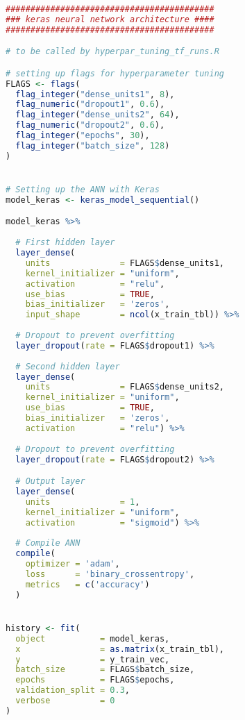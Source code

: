 \begin{lstlisting}[language=R,caption={Flagged neural net architecture for hyperparameter tuning}, label=lst_architecture]
##########################################
### keras neural network architecture ####
##########################################

# to be called by hyperpar_tuning_tf_runs.R

# setting up flags for hyperparameter tuning
FLAGS <- flags(
  flag_integer("dense_units1", 8),
  flag_numeric("dropout1", 0.6),
  flag_integer("dense_units2", 64),
  flag_numeric("dropout2", 0.6),
  flag_integer("epochs", 30),
  flag_integer("batch_size", 128)
)


# Setting up the ANN with Keras
model_keras <- keras_model_sequential()

model_keras %>% 
  
  # First hidden layer
  layer_dense(
    units              = FLAGS$dense_units1,
    kernel_initializer = "uniform", 
    activation         = "relu", 
    use_bias           = TRUE,
    bias_initializer   = 'zeros',
    input_shape        = ncol(x_train_tbl)) %>% 
  
  # Dropout to prevent overfitting
  layer_dropout(rate = FLAGS$dropout1) %>%
  
  # Second hidden layer
  layer_dense(
    units              = FLAGS$dense_units2,
    kernel_initializer = "uniform",
    use_bias           = TRUE,
    bias_initializer   = 'zeros',
    activation         = "relu") %>%
  
  # Dropout to prevent overfitting
  layer_dropout(rate = FLAGS$dropout2) %>%

  # Output layer
  layer_dense(
    units              = 1, 
    kernel_initializer = "uniform", 
    activation         = "sigmoid") %>% 
  
  # Compile ANN
  compile(
    optimizer = 'adam',
    loss      = 'binary_crossentropy',
    metrics   = c('accuracy')
  )


history <- fit(
  object           = model_keras, 
  x                = as.matrix(x_train_tbl), 
  y                = y_train_vec,
  batch_size       = FLAGS$batch_size, 
  epochs           = FLAGS$epochs,
  validation_split = 0.3,
  verbose          = 0
)

      
\end{lstlisting}